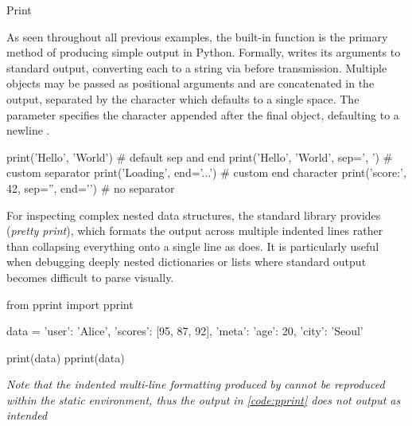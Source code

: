 \documentclass[10pt]{article}
\begin{document}
    \begin{core}{Print}

      As seen throughout all previous examples, the built-in  function is the primary method of producing simple output in Python. Formally,  writes its arguments to standard output, converting each to a string via  before transmission. Multiple objects may be passed as positional arguments and are concatenated in the output, separated by the  character which defaults to a single space. The  parameter specifies the character appended after the final object, defaulting to a newline .

      \begin{pyconsole}

        print('Hello', 'World') # default sep and end
        print('Hello', 'World', sep=', ') # custom separator
        print('Loading', end='...\n') # custom end character
        print('score:', 42, sep='', end='\n') # no separator

      \end{pyconsole}

      For inspecting complex nested data structures, the standard library provides  (\textit{pretty print}), which formats the output across multiple indented lines rather than collapsing everything onto a single line as  does. It is particularly useful when debugging deeply nested dictionaries or lists where standard  output becomes difficult to parse visually.

      \begin{pyconsole}
        from pprint import pprint

        data = {'user': 'Alice', 'scores': [95, 87, 92], 'meta': {'age': 20, 'city': 'Seoul'}}

        print(data)
        pprint(data)

      \end{pyconsole}

    \textit{Note that the indented multi-line formatting produced by}  \textit{cannot be reproduced within the static}  \textit{environment, thus the output in \autoref{code:pprint} does not output as intended}

    \end{core}
\end{document}
